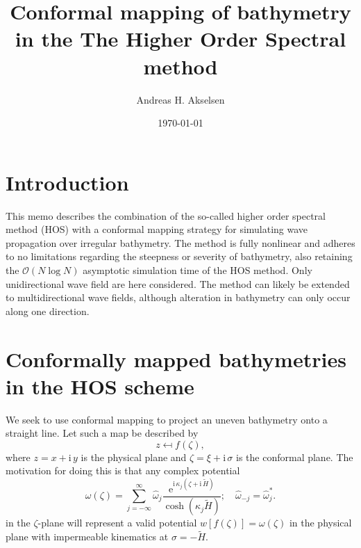 \documentclass[internal]{sintefmemo}
\title{Conformal mapping of bathymetry in the The Higher Order Spectral method}
\author{Andreas H. Akselsen}
\date{\today}
\newcommand{\mr}{\mathrm}
\newcommand{\ii}{\mr{i}\,}
\newcommand{\ee}{\mr{e}}
\renewcommand{\_}[1]{_\mr{#1}}
\newcommand{\w}{w}
\newcommand{\h}{\hat}
\newcommand{\z}{z}
\newcommand{\x}{x}
\newcommand{\y}{y}
\newcommand{\zz}{\zeta}
\newcommand{\xx}{\xi}
\newcommand{\yy}{\sigma}
\newcommand{\kk}{\kappa}
\newcommand{\zmap}{f}
\newcommand{\ww}{\omega}
\renewcommand{\w}{w}
\begin{document}
\frontmatter

\tableofcontents

\section{Introduction}
This memo describes the combination of the so-called higher order spectral method (HOS) with a conformal mapping strategy for simulating wave propagation over irregular bathymetry.
The method is fully nonlinear and adheres to no limitations regarding the steepness or severity of bathymetry, also retaining the $\mathcal O(N\log N)$ asymptotic simulation time of the HOS method. 
Only unidirectional wave field are here considered. The method can likely be extended to multidirectional wave fields, although alteration in bathymetry can only occur along one direction.


\section{Conformally mapped bathymetries in the HOS scheme}
We seek to use conformal mapping to project an uneven bathymetry onto a straight line.
Let such a map be described by 
\begin{equation*}
	\z \mapsfrom \zmap(\zz),
\end{equation*}
where $\z = \x+\ii\y$ is the physical plane and $\zz=\xx+\ii\yy$ is the conformal plane. 
The motivation for doing this is that any complex potential 
\begin{equation}
\ww(\zz) = \sum_{j=-\infty}^\infty \h\ww_j \frac{\ee^{\ii \kk_j(\zz+\ii\tilde H)}}{\cosh(\kk_j \tilde H)}; \quad \h\ww_{-j}=\h\ww_{j}^*.
\label{eq:ww}
\end{equation}
in the $\zz$-plane will represent a valid potential $\w[\zmap(\zz)]=\ww(\zz)$ in the physical plane with impermeable kinematics at $\yy=-\tilde H$.
\\
\end{document}

